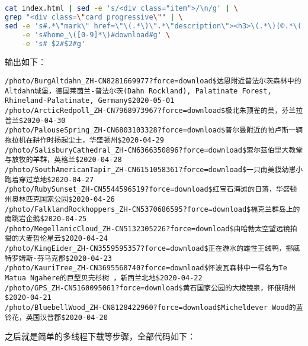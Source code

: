\documentclass[blue,normal,cn]{elegantnote}
\begin{document}
\begin{lstlisting}[language=bash]
cat index.html | sed -e 's/<div class="item">/\n/g' | \
grep "<div class=\"card progressive\"" | \
sed -e 's#.*\"mark\" href=\"\(.*\)\".*\"description\"><h3>\(.*\)(©.*\([0-9]\{4\}\-[0-9]\{2\}-[0-9]\{2\}\)<.*#\1$\2$\3#g' \
	-e 's#home_\([0-9]*\)#download#g' \
	-e 's# $2#$2#g'
\end{lstlisting}

输出如下：

\begin{lstlisting}
/photo/BurgAltdahn_ZH-CN8281669977?force=download$达恩附近普法尔茨森林中的Altdahn城堡，德国莱茵兰-普法尔茨(Dahn Rockland), Palatinate Forest, Rhineland-Palatinate, Germany$2020-05-01
/photo/ArcticRedpoll_ZH-CN7968973967?force=download$极北朱顶雀的巢，芬兰拉普兰$2020-04-30
/photo/PalouseSpring_ZH-CN6803103328?force=download$普尔曼附近的帕卢斯一辆拖拉机在耕作时扬起尘土，华盛顿州$2020-04-29
/photo/SalisburyCathedral_ZH-CN6366350896?force=download$索尔茲伯里大教堂与放牧的羊群，英格兰$2020-04-28
/photo/SouthAmericanTapir_ZH-CN6151058361?force=download$一只南美貘幼崽小跑着穿过草地$2020-04-27
/photo/RubySunset_ZH-CN5544596519?force=download$红宝石海滩的日落，华盛顿州奥林匹克国家公园$2020-04-26
/photo/FalklandRockhoppers_ZH-CN5370686595?force=download$福克兰群岛上的南跳岩企鹅$2020-04-25
/photo/MegellanicCloud_ZH-CN5132305226?force=download$由哈勃太空望远镜拍摄的大麦哲伦星云$2020-04-24
/photo/KingEider_ZH-CN3559595357?force=download$正在游水的雄性王绒鸭，挪威特罗姆斯-芬马克郡$2020-04-23
/photo/KauriTree_ZH-CN3695568740?force=download$怀波瓦森林中一棵名为Te Matua Ngahere的巨型贝壳杉树 ，新西兰北地$2020-04-22
/photo/GPS_ZH-CN5160095061?force=download$黄石国家公园的大棱镜泉，怀俄明州$2020-04-21
/photo/BluebellWood_ZH-CN8128422960?force=download$Micheldever Wood的蓝铃花，英国汉普郡$2020-04-20
\end{lstlisting}

之后就是简单的多线程下载等步骤，全部代码如下：
\end{document}
